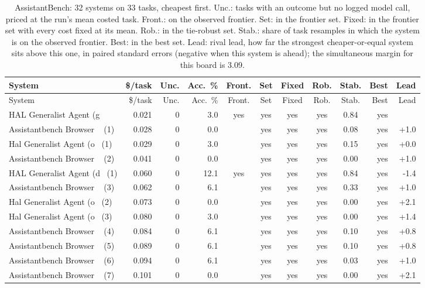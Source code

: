 {\scriptsize\setlength{\tabcolsep}{2pt}
\begin{longtable}{lrrrcccccrr}
\caption{AssistantBench: 32 systems on 33 tasks, cheapest first. Unc.: tasks with an outcome but no logged model call, priced at the run's mean costed task. Front.: on the observed frontier. Set: in the frontier set. Fixed: in the frontier set with every cost fixed at its mean. Rob.: in the tie-robust set. Stab.: share of task resamples in which the system is on the observed frontier. Best: in the best set. Lead: rival lead, how far the strongest cheaper-or-equal system sits above this one, in paired standard errors (negative when this system is ahead); the simultaneous margin for this board is 3.09.}\label{tab:supp-hal_assistantbench}\\
\toprule
System & \$/task & Unc. & Acc.\ \% & Front. & Set & Fixed & Rob. & Stab. & Best & Lead \\
\midrule
\endfirsthead
\toprule
System & \$/task & Unc. & Acc.\ \% & Front. & Set & Fixed & Rob. & Stab. & Best & Lead \\
\midrule
\endhead
\bottomrule
\endfoot
HAL Generalist Agent (g~ & 0.021 & 0 & 3.0 & yes & yes & yes & yes & 0.84 & yes &  \\
Assistantbench Browser ~ (1) & 0.028 & 0 & 0.0 &  & yes & yes & yes & 0.08 & yes & +1.0 \\
Hal Generalist Agent (o~ (1) & 0.029 & 0 & 3.0 &  & yes & yes & yes & 0.15 & yes & +0.0 \\
Assistantbench Browser ~ (2) & 0.041 & 0 & 0.0 &  & yes & yes & yes & 0.00 & yes & +1.0 \\
HAL Generalist Agent (d~ (1) & 0.060 & 0 & 12.1 & yes & yes & yes & yes & 0.84 & yes & -1.4 \\
Assistantbench Browser ~ (3) & 0.062 & 0 & 6.1 &  & yes & yes & yes & 0.33 & yes & +1.0 \\
Hal Generalist Agent (o~ (2) & 0.073 & 0 & 0.0 &  & yes & yes & yes & 0.00 & yes & +2.1 \\
Hal Generalist Agent (o~ (3) & 0.080 & 0 & 3.0 &  & yes & yes & yes & 0.00 & yes & +1.4 \\
Assistantbench Browser ~ (4) & 0.084 & 0 & 6.1 &  & yes & yes & yes & 0.10 & yes & +0.8 \\
Assistantbench Browser ~ (5) & 0.089 & 0 & 6.1 &  & yes & yes & yes & 0.10 & yes & +0.8 \\
Assistantbench Browser ~ (6) & 0.094 & 0 & 6.1 &  & yes & yes & yes & 0.03 & yes & +1.0 \\
Assistantbench Browser ~ (7) & 0.101 & 0 & 0.0 &  & yes & yes & yes & 0.00 & yes & +2.1 \\

\end{longtable}}
